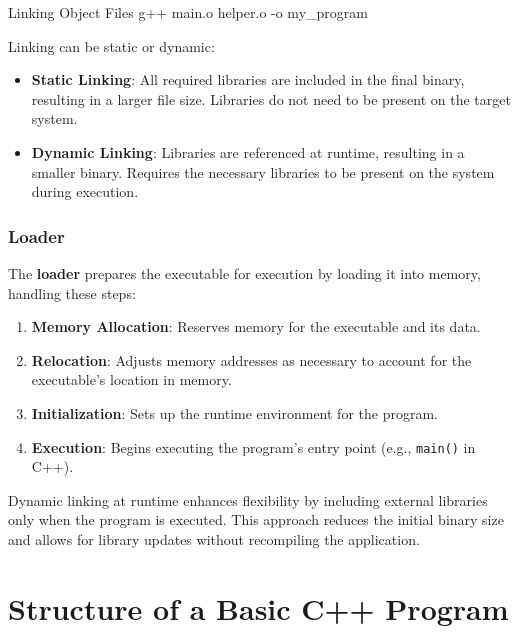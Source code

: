     \begin{neonlisting}[language=bash]{Linking Object Files}
    g++ main.o helper.o -o my_program
    \end{neonlisting}
    
    Linking can be static or dynamic:
    \begin{itemize}
        \item \textbf{Static Linking}: All required libraries are included in the final binary, resulting in a larger file size. Libraries do not need to be present on the target system.
        \item \textbf{Dynamic Linking}: Libraries are referenced at runtime, resulting in a smaller binary. Requires the necessary libraries to be present on the system during execution.
    \end{itemize}

\subsubsection{Loader}
    
    The \textbf{loader} prepares the executable for execution by loading it into memory, handling these steps:
    \begin{enumerate}
        \item \textbf{Memory Allocation}: Reserves memory for the executable and its data.
        \item \textbf{Relocation}: Adjusts memory addresses as necessary to account for the executable's location in memory.
        \item \textbf{Initialization}: Sets up the runtime environment for the program.
        \item \textbf{Execution}: Begins executing the program's entry point (e.g., \texttt{main()} in C++).
    \end{enumerate}
    
    \begin{observationblock}
        Dynamic linking at runtime enhances flexibility by including external libraries only when the program is executed. This approach reduces the initial binary size and allows for library updates without recompiling the application.
    \end{observationblock}

\section{Structure of a Basic C++ Program}

